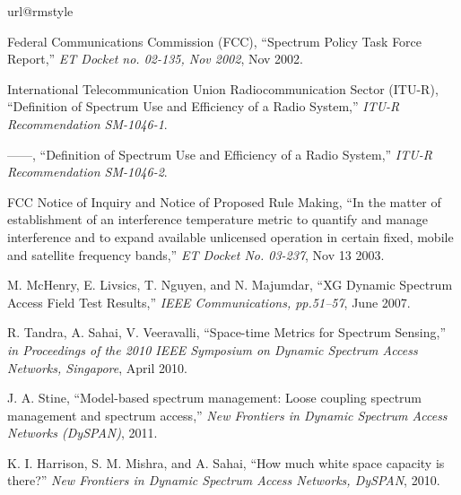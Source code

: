 \documentclass[journal,12pt,draftclsnofoot,onecolumn]{IEEEtran}
\begin{document}
\begin{thebibliography}{10}
\providecommand{\url}[1]{#1}
\csname url@rmstyle\endcsname
\providecommand{\newblock}{\relax}
\providecommand{\bibinfo}[2]{#2}
\providecommand\BIBentrySTDinterwordspacing{\spaceskip=0pt\relax}
\providecommand\BIBentryALTinterwordstretchfactor{4}
\providecommand\BIBentryALTinterwordspacing{\spaceskip=\fontdimen2\font plus
\BIBentryALTinterwordstretchfactor\fontdimen3\font minus
  \fontdimen4\font\relax}
\providecommand\BIBforeignlanguage[2]{{\expandafter\ifx\csname l@#1\endcsname\relax
\typeout{** WARNING: IEEEtran.bst: No hyphenation pattern has been}\typeout{** loaded for the language `#1'. Using the pattern for}\typeout{** the default language instead.}\else
\language=\csname l@#1\endcsname
\fi
#2}}

{Federal Communications Commission (FCC)}, ``{Spectrum Policy Task Force
  Report},'' \emph{ET Docket no. 02-135, Nov 2002}, Nov 2002.

{International Telecommunication Union Radiocommunication Sector (ITU-R)},
  ``{Definition of Spectrum Use and Efficiency of a Radio System},''
  \emph{ITU-R Recommendation SM-1046-1}.

------, ``{Definition of Spectrum Use and Efficiency of a Radio System},''
  \emph{ITU-R Recommendation SM-1046-2}.

{FCC Notice of Inquiry and Notice of Proposed Rule Making}, ``{In the matter of
  establishment of an interference temperature metric to quantify and manage
  interference and to expand available unlicensed operation in certain fixed,
  mobile and satellite frequency bands},'' \emph{ET Docket No. 03-237}, Nov 13
  2003.

{M. McHenry, E. Livsics, T. Nguyen, and N. Majumdar}, ``{XG Dynamic Spectrum
  Access Field Test Results},'' \emph{IEEE Communications, pp.51–57}, June
  2007.

{R. Tandra, A. Sahai, V. Veeravalli}, ``{Space-time Metrics for Spectrum
  Sensing},'' \emph{in Proceedings of the 2010 IEEE Symposium on Dynamic
  Spectrum Access Networks, Singapore}, April 2010.

{J. A. Stine}, ``{Model-based spectrum management: Loose coupling spectrum
  management and spectrum access},'' \emph{New Frontiers in Dynamic Spectrum
  Access Networks (DySPAN)}, 2011.

{K. I. Harrison, S. M. Mishra, and A. Sahai}, ``How much white space capacity
  is there?'' \emph{{New Frontiers in Dynamic Spectrum Access Networks,
  DySPAN}}, 2010.


\end{thebibliography}
\end{document}
